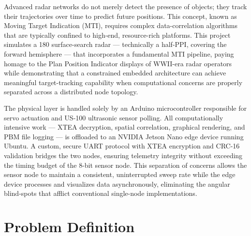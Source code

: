 \documentclass[14pt]{article}
\begin{document}
Advanced radar networks do not merely detect the presence of objects; they
track their trajectories over time to predict future positions. This concept,
known as Moving Target Indication (MTI), requires complex data-correlation
algorithms that are typically confined to high-end, resource-rich platforms.
This project simulates a 180\textdegree{} surface-search radar --- technically
a half-PPI, covering the forward hemisphere --- that incorporates a fundamental
MTI pipeline, paying homage to the Plan Position Indicator displays of WWII-era
radar operators while demonstrating that a constrained embedded architecture can
achieve meaningful target-tracking capability when computational concerns are
properly separated across a distributed node topology.

The physical layer is handled solely by an Arduino microcontroller responsible
for servo actuation and US-100 ultrasonic sensor polling. All computationally
intensive work --- XTEA decryption, spatial correlation, graphical rendering,
and PBM file logging --- is offloaded to an NVIDIA Jetson Nano edge
device running Ubuntu. A custom, secure UART protocol with XTEA encryption and
CRC-16 validation bridges the two nodes, ensuring telemetry integrity without
exceeding the timing budget of the 8-bit sensor node. This separation of
concerns allows the sensor node to maintain a consistent, uninterrupted sweep
rate while the edge device processes and visualizes data asynchronously,
eliminating the angular blind-spots that afflict conventional single-node
implementations.

\section{Problem Definition}
\end{document}
